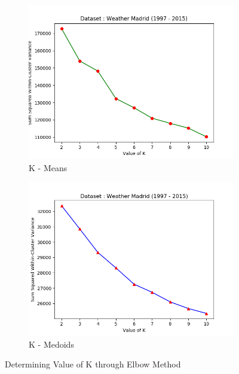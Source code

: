 \documentclass[12pt]{article}
\begin{document}
\begin{figure}[]
	\centering
	\begin{subfigure}{0.5\linewidth}
		\includegraphics[scale=0.55]{Elbow_Weather.png}
		\caption{K - Means}
		\label{fig:elbow_weather}
	\end{subfigure}%
	\begin{subfigure}{0.5\linewidth}
		\includegraphics[scale=0.55]{k_medoids_elbow_weather.png}
		\caption{K - Medoids}
		\label{fig:elbow_w_medoid}
	\end{subfigure}
	\caption{Determining Value of K through Elbow Method}
\end{figure}
\end{document}
